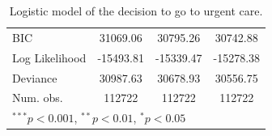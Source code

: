 \documentclass[12pt,twoside]{reedthesis}
\begin{document}
\begin{table}
\begin{center}
\begin{footnotesize}
\begin{tabular}{l c c c }
  BIC                           & 31069.06               & 30795.26               & 30742.88               \\
  Log Likelihood                & -15493.81              & -15339.47              & -15278.38              \\
  Deviance                      & 30987.63               & 30678.93               & 30556.75               \\
  Num. obs.                     & 112722                 & 112722                 & 112722                 \\
  \hline
  \multicolumn{4}{l}{\tiny{$^{***}p<0.001$, $^{**}p<0.01$, $^*p<0.05$}}
  \end{tabular}
  \end{footnotesize}
  \caption{Logistic model of the decision to go to urgent care.}
  \label{table:coefficients}
  \end{center}
  \end{table}
  
\end{document}
